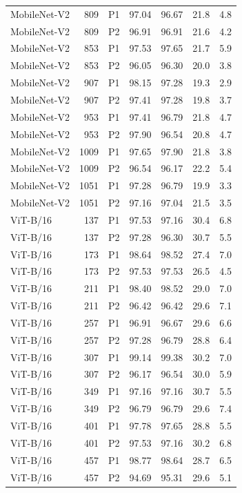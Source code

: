 {\begin{longtable}{lrlrrrr}
MobileNet-V2 & 809 & P1 & 97.04 & 96.67 & 21.8 & 4.8 \\
MobileNet-V2 & 809 & P2 & 96.91 & 96.91 & 21.6 & 4.2 \\
MobileNet-V2 & 853 & P1 & 97.53 & 97.65 & 21.7 & 5.9 \\
MobileNet-V2 & 853 & P2 & 96.05 & 96.30 & 20.0 & 3.8 \\
MobileNet-V2 & 907 & P1 & 98.15 & 97.28 & 19.3 & 2.9 \\
MobileNet-V2 & 907 & P2 & 97.41 & 97.28 & 19.8 & 3.7 \\
MobileNet-V2 & 953 & P1 & 97.41 & 96.79 & 21.8 & 4.7 \\
MobileNet-V2 & 953 & P2 & 97.90 & 96.54 & 20.8 & 4.7 \\
MobileNet-V2 & 1009 & P1 & 97.65 & 97.90 & 21.8 & 3.8 \\
MobileNet-V2 & 1009 & P2 & 96.54 & 96.17 & 22.2 & 5.4 \\
MobileNet-V2 & 1051 & P1 & 97.28 & 96.79 & 19.9 & 3.3 \\
MobileNet-V2 & 1051 & P2 & 97.16 & 97.04 & 21.5 & 3.5 \\
ViT-B/16 & 137 & P1 & 97.53 & 97.16 & 30.4 & 6.8 \\
ViT-B/16 & 137 & P2 & 97.28 & 96.30 & 30.7 & 5.5 \\
ViT-B/16 & 173 & P1 & 98.64 & 98.52 & 27.4 & 7.0 \\
ViT-B/16 & 173 & P2 & 97.53 & 97.53 & 26.5 & 4.5 \\
ViT-B/16 & 211 & P1 & 98.40 & 98.52 & 29.0 & 7.0 \\
ViT-B/16 & 211 & P2 & 96.42 & 96.42 & 29.6 & 7.1 \\
ViT-B/16 & 257 & P1 & 96.91 & 96.67 & 29.6 & 6.6 \\
ViT-B/16 & 257 & P2 & 97.28 & 96.79 & 28.8 & 6.4 \\
ViT-B/16 & 307 & P1 & 99.14 & 99.38 & 30.2 & 7.0 \\
ViT-B/16 & 307 & P2 & 96.17 & 96.54 & 30.0 & 5.9 \\
ViT-B/16 & 349 & P1 & 97.16 & 97.16 & 30.7 & 5.5 \\
ViT-B/16 & 349 & P2 & 96.79 & 96.79 & 29.6 & 7.4 \\
ViT-B/16 & 401 & P1 & 97.78 & 97.65 & 28.8 & 5.5 \\
ViT-B/16 & 401 & P2 & 97.53 & 97.16 & 30.2 & 6.8 \\
ViT-B/16 & 457 & P1 & 98.77 & 98.64 & 28.7 & 6.5 \\
ViT-B/16 & 457 & P2 & 94.69 & 95.31 & 29.6 & 5.1 \\

\end{longtable}}
